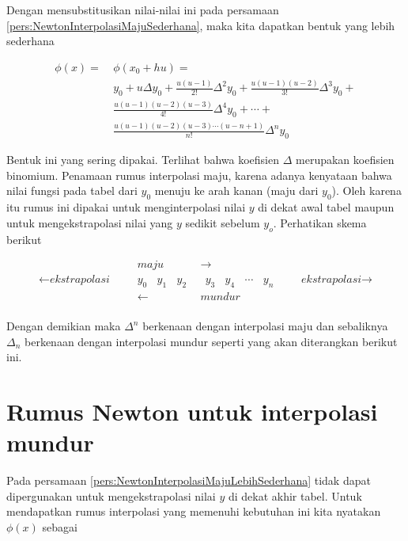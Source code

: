 Dengan mensubstitusikan nilai-nilai ini pada persamaan \ref{pers:NewtonInterpolasiMajuSederhana}, maka kita dapatkan bentuk yang lebih sederhana

\begin{equation}\label{pers:NewtonInterpolasiMajuLebihSederhana}
\begin{split}
\phi(x) =~& \phi(x_0 + hu) = \\
& y_0 + u\Delta y_0 + \frac{u(u-1)}{2!}\Delta^2y_0 + \frac{u(u-1)(u-2)}{3!}\Delta^3y_0 +\\
& \frac{u(u-1)(u-2)(u-3)}{4!}\Delta^4y_0 + \cdots +\\
& \frac{u(u-1)(u-2)(u-3) \cdots (u-n+1)}{n!}\Delta^n y_0
\end{split}
\end{equation}

Bentuk ini yang sering dipakai. Terlihat bahwa koefisien $\Delta$ merupakan koefisien binomium. Penamaan rumus interpolasi maju, karena adanya kenyataan bahwa nilai fungsi pada tabel dari $y_0$ menuju ke arah kanan (maju dari $y_0$). Oleh karena itu rumus ini dipakai untuk menginterpolasi nilai $y$ di dekat awal tabel maupun untuk mengekstrapolasi nilai yang $y$ sedikit sebelum $y_o$. Perhatikan skema berikut

\begin{align*}
& & \textit{maju}&\rightarrow & &\\
\leftarrow\textit{ekstrapolasi}~~~~& & y_0 ~~~~ y_1 ~~~~ y_2 ~~&~~ y_3 ~~~~ y_4 ~~~~ \cdots ~~~~ y_n & &~~~~\textit{ekstrapolasi}\rightarrow\\
& & \leftarrow&\textit{mundur} & &\\
\end{align*}

Dengan demikian maka $\Delta^n$ berkenaan dengan interpolasi maju dan sebaliknya $\Delta_n$ berkenaan dengan interpolasi mundur seperti yang akan diterangkan berikut ini.

\section{Rumus Newton untuk interpolasi mundur}
Pada persamaan \ref{pers:NewtonInterpolasiMajuLebihSederhana} tidak dapat dipergunakan untuk mengekstrapolasi nilai $y$ di dekat akhir tabel. Untuk mendapatkan rumus interpolasi yang memenuhi kebutuhan ini kita nyatakan $\phi(x)$ sebagai

